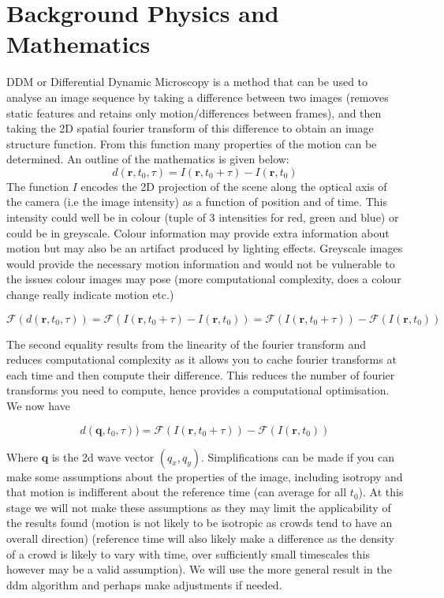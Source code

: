 \documentclass[11pt]{article}
\begin{document}
\section{Background Physics and Mathematics}
DDM or Differential Dynamic Microscopy is a method that can be used to analyse an image sequence by taking a difference between two images (removes static features and retains only motion/differences between frames),
and then taking the 2D spatial fourier transform of this difference to obtain an image structure function.
From this function many properties of the motion can be determined.\cite{ddm1}
An outline of the mathematics is given below:
\\
\begin{equation}
    d(\textbf{r}, t_0, \tau) = I(\mathbf{r}, t_0 + \tau) - I(\mathbf{r}, t_0)
\end{equation}
The function $\textit{I}$ encodes the 2D projection of the scene along the optical axis of the camera (i.e the image intensity) as a function of position and of time.
This intensity could well be in colour (tuple of 3 intensities for red, green and blue) or could be in greyscale.
Colour information may provide extra information about motion but may also be an artifact produced by lighting effects.
Greyscale images would provide the necessary motion information and would not be vulnerable to the issues colour images may pose (more computational complexity, does a colour change really indicate motion etc.)

\begin{equation}
    \mathscr{F} (d(\textbf{r}, t_0, \tau) ) = \mathscr{F} (I(\mathbf{r}, t_0 + \tau) - I(\mathbf{r}, t_0)) = \mathscr{F}(I(\mathbf{r}, t_0 + \tau)) - \mathscr{F}(I(\mathbf{r}, t_0))
\end{equation}

The second equality results from the linearity of the fourier transform and reduces computational complexity as it allows you to cache fourier transforms at each time and then compute their difference.
This reduces the number of fourier transforms you need to compute, hence provides a computational optimisation.\cite{ddm2}
We now have

\begin{equation}
    d(\textbf{q}, t_0, \tau) ) = \mathscr{F}(I(\mathbf{r}, t_0 + \tau)) - \mathscr{F}(I(\mathbf{r}, t_0))
\end{equation}

Where $\textbf{q}$ is the 2d wave vector $(q_x, q_y)$.
Simplifications can be made if you can make some assumptions about the properties of the image, including isotropy and that motion is indifferent about the reference time (can average for all $t_0$).\cite{ddm1}
At this stage we will not make these assumptions as they may limit the applicability of the results found (motion is not likely to be isotropic as crowds tend to have an overall direction)
(reference time will also likely make a difference as the density of a crowd is likely to vary with time, over sufficiently small timescales this however may be a valid assumption).
We will use the more general result in the ddm algorithm and perhaps make adjustments if needed.
\end{document}
